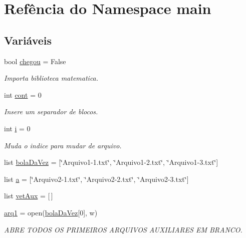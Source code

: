 \hypertarget{namespacemain}{}\section{Refência do Namespace main}
\label{namespacemain}
\subsection*{Variáveis}
\begin{DoxyCompactItemize}
\item 
bool \hyperlink{namespacemain_a8f970243fb58a2da4017c046ef996563}{chegou} = False
\begin{DoxyCompactList}\small\item\em Importa biblioteca matematica. \end{DoxyCompactList}\item 
int \hyperlink{namespacemain_a4cda66d1bad44953d624f658802db676}{cont} = 0
\begin{DoxyCompactList}\small\item\em Insere um separador de blocos. \end{DoxyCompactList}\item 
int \hyperlink{namespacemain_ade6e2febf33b88a767c2e85902add210}{i} = 0
\begin{DoxyCompactList}\small\item\em Muda o indice para mudar de arquivo. \end{DoxyCompactList}\item 
list \hyperlink{namespacemain_a1a062cd836b3711b8674874524bf97dc}{bola\+Da\+Vez} = \mbox{[}\char`\"{}Arquivo1-\/1.txt\char`\"{}, \char`\"{}Arquivo1-\/2.txt\char`\"{}, \char`\"{}Arquivo1-\/3.txt\char`\"{}\mbox{]}
\item 
list \hyperlink{namespacemain_aa164244f9ef98d3941710f56dae766dc}{a} = \mbox{[}\char`\"{}Arquivo2-\/1.txt\char`\"{}, \char`\"{}Arquivo2-\/2.txt\char`\"{}, \char`\"{}Arquivo2-\/3.txt\char`\"{}\mbox{]}
\item 
list \hyperlink{namespacemain_a7499c72081b7c9814c7d9be3410e2253}{vet\+Aux} = \mbox{[}$\,$\mbox{]}
\item 
\hyperlink{namespacemain_acce0df181fcd17c6c85677bd759fc702}{arq1} = open(\hyperlink{namespacemain_a1a062cd836b3711b8674874524bf97dc}{bola\+Da\+Vez}\mbox{[}0\mbox{]}, \textquotesingle{}w\textquotesingle{})
\begin{DoxyCompactList}\small\item\em A\+B\+RE T\+O\+D\+OS OS P\+R\+I\+M\+E\+I\+R\+OS A\+R\+Q\+U\+I\+V\+OS A\+U\+X\+I\+L\+I\+A\+R\+ES EM B\+R\+A\+N\+CO. \end{DoxyCompactList}\item 

\end{DoxyCompactItemize}
